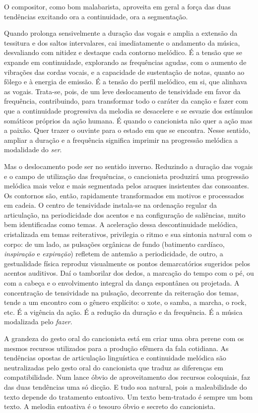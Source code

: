 O compositor, como bom malabarista, aproveita em geral a força das duas
tendências excitando ora a continuidade, ora a segmentação.

Quando prolonga sensivelmente a duração das vogais e amplia a extensão
da tessitura e dos saltos intervalares, cai imediatamente o andamento da
música, desvaliando com nitidez e destaque cada contorno melódico. É a
tensão que se expande em continuidade, explorando as frequências agudas,
com o aumento de vibrações das cordas vocais, e a capacidade de sustentação
de notas, quanto ao fôlego e à energia de emissão. É a tensão do perfil melódico,
em si, que alinhava as vogais. Trata-se, pois, de um leve deslocamento
de tensividade em favor da frequência, contribuindo, para transformar
todo o caráter da canção e fazer com que a continuidade progressiva da
melodia se desacelere e se esvazie dos estímulos somáticos próprios da
ação humana. É quando o cancionista não quer a ação mas a paixão. Quer
trazer o ouvinte para o estado em que se encontra. Nesse sentido,
ampliar a duração e a frequência significa imprimir na progressão
melódica a modalidade do \textit{ser}.

Mas o deslocamento pode ser no sentido inverno. Reduzindo a duração das
vogais e o campo de utilização das frequências, o cancionista produzirá
uma progressão melódica mais veloz e mais segmentada pelos araques
insistentes das consoantes. Os contornos são, então, rapidamente
transformados em motivos e processados em cadeia. O centro de
tensividade instala-se na ordenação regular da articulação, na
periodicidade dos acentos e na configuração de saliências, muito bem
identificadas como temas. A aceleração dessa descontinuidade melódica,
cristalizada em temas reiterativos, privilegia o ritmo e sua sintonia
natural com o corpo: de um lado, as pulsações orgânicas de fundo
(batimento cardíaco, \textit{inspiração} e \textit{expiração}) refletem de antemão a
periodicidade, de outro, a gestualidade física reproduz visualmente os
pontos demarcatórios sugeridos pelos acentos auditivos. Daí o tamborilar
dos dedos, a marcação do tempo com o pé, ou com a cabeça e o
envolvimento integral da dança espontânea ou projetada. A concentração
de tensividade na pulsação, decorrente da reiteração dos temas, tende a
um encontro com o gênero explícito: o xote, o samba, a marcha, o rock,
etc. É a vigência da ação. É a redução da duração e da
frequência. É a música modalizada pelo \textit{fazer}.

A grandeza do gesto oral do cancionista está em criar uma obra perene
com os mesmos recursos utilizados para a produção efêmera da fala
cotidiana. As tendências opostas de articulação linguística e
continuidade melódica são neutralizadas pelo gesto oral do cancionista
que traduz as diferenças em compatibilidade. Num lance óbvio de
aproveitamento dos recursos coloquiais, faz das duas tendências uma só
dicção. E tudo soa natural, pois a maleabilidade do texto depende do
tratamento entoativo. Um texto bem-tratado é sempre um bom texto. A
melodia entoativa é o tesouro óbvio e secreto do cancionista.

